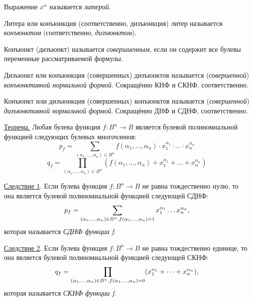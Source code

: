 \documentclass[12pt]{article}
\begin{document}
\par Выражение $x^\alpha$ называется \textit{литерой}.
\par Литера или конъюнкция (соответственно, дизъюнкция) литер называется \textit{конъюнктом} (соответственно, \textit{дизъюнктом}).
\par Конъюнкт (дизъюнкт) называется \textit{совершиенным}, если он содержит все булевы переменные рассматриваемой формулы.
\par Дизъюнкт или конъюнкция (совершенных) дизъюнктов называется (\textit{совершенной}) \textit{конъюнктивной нормальной формой}. Сокращённо КНФ и СКНФ, соответственно.
\par Конъюнкт или дизъюнкция (совершенных) конъюнктов называется (\textit{совершенной}) \textit{дизъюнктивной нормальной формой}. Сокращённо ДНФ и СДНФ, соответственно.
\par \underline{Теорема.} Любая булева функция $f:B^n \to B$ является булевой полиномиальной функцией следующих булевых многочленов:
\begin{equation*}
    p_f = \sum_{(\alpha_1,\dots,\alpha_n) \in B^n} f(\alpha_1, \dots, \alpha_n) \cdot x_1^{\alpha_1} \cdot \dots \cdot x_n^{\alpha_n}
\end{equation*}
\begin{equation*}
    q_f = \prod_{(\alpha_1,\dots,\alpha_n) \in B^n} (f(\alpha_1, \dots, \alpha_n) + x_1^{\alpha_1} + \dots + x_n^{\alpha_n})
\end{equation*}
\par \underline{Следствие 1}. Если булева функция $f:B^n \to B$ не равна тождественно нулю, то она является булевой полиномиальной функцией следующей СДНФ:
\begin{equation*}
    p_f = \sum_{(\alpha_1,\dots,\alpha_n) \in B^n, \\ f(\alpha_1, \dots, \alpha_n) = 1} x_1^{\alpha_1} \dots x_n^{\alpha_n},
\end{equation*}
которая называется \textit{СДНФ функции f}.
\par \underline{Следствие 2}. Если булева функция $f: B^n \to B$ не равна тождественно единице, то она является булевой полиномиальной функцией следующей СКНФ:
\begin{equation*}
    q_f = \prod_{(\alpha_1,\dots,\alpha_n) \in B^n, \\ f(\alpha_1, \dots, \alpha_n) = 0} (x_1^{\alpha_1} + \dots + x_n^{\alpha_n}),
\end{equation*}
которая называется \textit{СКНФ функции f}.
\end{document}
